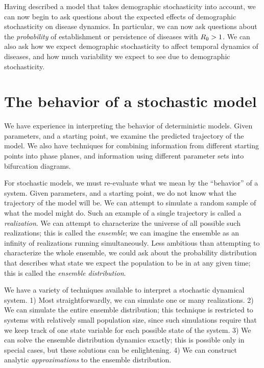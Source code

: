 \documentclass{amsproc}
\theoremstyle{definition}
\theoremstyle{remark}
\numberwithin{equation}{section}
\begin{document}
Having described a model that takes demographic stochasticity into account, we can now begin to ask questions about the expected effects of demographic stochasticity on disease dynamics. 
In particular, we can now ask questions about the {\em probability} of establishment or persistence of diseases with $R_0>1$.  We can also ask how we expect demographic stochasticity to affect temporal dynamics of diseases, and how much variability we expect to see due to demographic stochasticity.

\section{The behavior of a stochastic model}

We have experience in interpreting the behavior of deterministic models.  
Given parameters, and a starting point, we examine the predicted trajectory of the model.  
We also have techniques for combining information from different starting points into phase planes, and information using different parameter sets into bifurcation diagrams.

For stochastic models, we must re-evaluate what we mean by the ``behavior'' of a system.  
Given parameters, and a starting point, we do not know what the trajectory of the model will be.  
We can attempt to simulate a random sample of what the model might do.  Such an example of a single trajectory is called a {\em realization}. 
We can attempt to characterize the universe of all possible such realizations; this is called the {\em ensemble}; we can imagine the ensemble as an infinity of realizations running simultaneously.
Less ambitious than attempting to characterize the whole ensemble, we could ask about the probability distribution that describes what state we expect the population to be in at any given time; this is called the {\em ensemble distribution}. 

We have a variety of techniques available to interpret a stochastic dynamical system.  
1) Most straightforwardly, we can simulate one or many realizations.   
2) We can simulate the entire ensemble distribution; this technique is restricted to systems with relatively small population size, since such  simulations require that we keep track of one state variable for each possible state of the system. 
3) We can solve the ensemble distribution dynamics exactly; this is possible only in special cases, but these solutions can be enlightening.
4) We can construct analytic {\em approximations} to the ensemble distribution.
\end{document}
